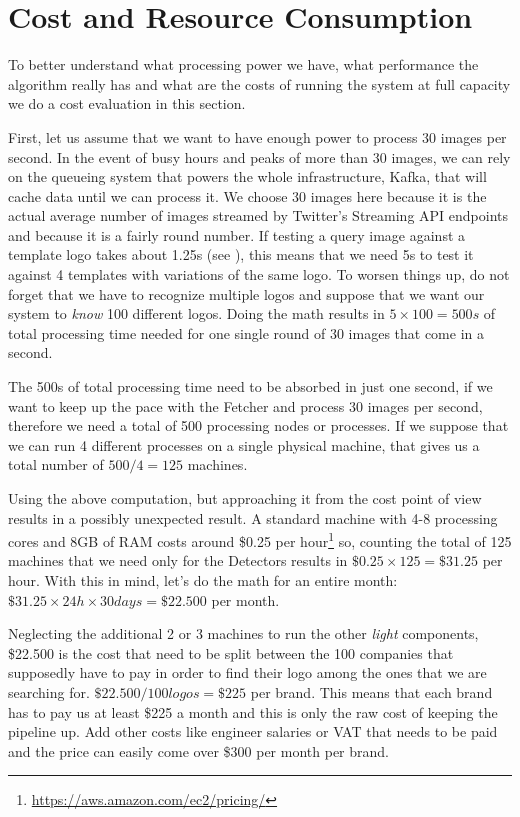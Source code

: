 \section{Cost and Resource Consumption}
\label{sec:cost-and-resource}

To better understand what processing power we have, what performance the
algorithm really has and what are the costs of running the system at full
capacity we do a cost evaluation in this section.

First, let us assume that we want to have enough power to process 30 images
per second. In the event of busy hours and peaks of more than 30 images, we can
rely on the queueing system that powers the whole infrastructure, Kafka, that
will cache data until we can process it. We choose 30 images here because it
is the actual average number of images streamed by Twitter's Streaming API
endpoints and because it is a fairly round number. If testing a query image
against a template logo takes about 1.25s (see
), this means that we need 5s to test it
against 4 templates with variations of the same logo. To worsen things up, do
not forget that we have to recognize multiple logos and suppose that we want
our system to \textit{know} 100 different logos. Doing the math results in \(5
\times 100 = 500s \) of total processing time needed for one single round of
30 images that come in a second.

The 500s of total processing time need to be absorbed in just one second, if
we want to keep up the pace with the Fetcher and process 30 images per second,
therefore we need a total of 500 processing nodes or processes. If we suppose
that we can run 4 different processes on a single physical machine, that gives
us a total number of \(500 / 4 = 125\) machines.

Using the above computation, but approaching it from the cost point of view
results in a possibly unexpected result. A standard machine with 4-8
processing cores and 8GB of RAM costs around \$0.25 per
hour\footnote{\url{https://aws.amazon.com/ec2/pricing/}} so, counting the
total of 125 machines that we need only for the Detectors results in \(\$0.25
\times 125 = \$31.25\) per hour. With this in mind, let's do the math for an
entire month: \(\$31.25 \times 24h \times 30days = \$22.500 \) per month.

Neglecting the additional 2 or 3 machines to run the other \textit{light}
components, \$22.500 is the cost that need to be split between the 100
companies that supposedly have to pay in order to find their logo among the
ones that we are searching for. \(\$22.500 / 100 logos = \$225 \) per
brand. This means that each brand has to pay us at least \$225 a month and
this is only the raw cost of keeping the pipeline up. Add other costs like
engineer salaries or VAT that needs to be paid and the price can easily come
over \$300 per month per brand.

